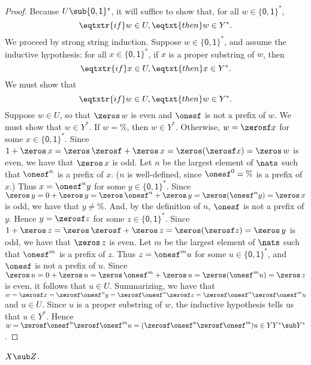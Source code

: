 \begin{proof}
Because $U\sub\{\mathsf{0,1}\}^*$, it will suffice to show that,
for all $w\in\{\mathsf{0,1}\}^*$,
\begin{displaymath}
  \eqtxtr{if} w\in U, \eqtxt{then} w\in Y^* .
\end{displaymath}
We proceed by strong string induction.  Suppose $w\in\{\mathsf{0,1}\}^*$,
and assume the inductive hypothesis: for all $x\in\{\mathsf{0,1}\}^*$,
if $x$ is a proper substring of $w$, then
\begin{displaymath}
  \eqtxtr{if} x\in U, \eqtxt{then} x\in Y^* .
\end{displaymath}
We must show that
\begin{displaymath}
  \eqtxtr{if} w\in U, \eqtxt{then} w\in Y^* .
\end{displaymath}
Suppose $w\in U$, so that $\zeros\,w$ is even and $\onesf$ is not a
prefix of $w$.  We must show that $w\in Y^*$.  If $w=\%$, then $w\in
Y^*$.  Otherwise, $w=\zerosf x$ for some $x\in\{\mathsf{0,1}\}^*$.
Since $1 + \zeros\,x = \zeros\,\zerosf + \zeros\,x = \zeros(\zerosf x)
= \zeros\,w$ is even, we have that $\zeros\,x$ is odd. Let $n$ be the
largest element of $\nats$ such that $\onesf^n$ is a prefix of
$x$. ($n$ is well-defined, since $\onesf^0=\%$ is a prefix of $x$.)
Thus $x = \onesf^ny$ for some $y\in\{\mathsf{0,1}\}^*$.  Since
$\zeros\, y = 0 + \zeros\,y = \zeros\,\onesf^n + \zeros\,y =
\zeros(\onesf^n y) = \zeros\,x$ is odd, we have that $y\neq\%$.  And,
by the definition of $n$, $\onesf$ is not a prefix of $y$.  Hence
$y=\zerosf z$ for some $z\in\{\mathsf{0,1}\}^*$.  Since $1 + \zeros\,z
= \zeros\,\zerosf + \zeros\,z = \zeros(\zerosf z) = \zeros\,y$ is odd,
we have that $\zeros\,z$ is even.  Let $m$ be the largest element of
$\nats$ such that $\onesf^m$ is a prefix of $z$.  Thus $z=\onesf^m u$
for some $u\in\{\mathsf{0,1}\}^*$, and $\onesf$ is not a prefix of
$u$.  Since $\zeros\,u = 0 + \zeros\,u = \zeros\,\onesf^m + \zeros\,u
= \zeros(\onesf^m u) = \zeros\,z$ is even, it follows that $u\in U$.
Summarizing, we have that $w = \zerosf x = \zerosf \onesf^n y =
\zerosf \onesf^n \zerosf z = \zerosf \onesf^n \zerosf \onesf^m u$ and
$u\in U$.  Since $u$ is a proper substring of $w$, the inductive
hypothesis tells us that $u\in Y^*$.  Hence $w = \zerosf \onesf^n
\zerosf \onesf^m u = (\zerosf \onesf^n \zerosf \onesf^m) u \in
YY^*\sub Y^*$.
\end{proof}

\begin{lemma}
\label{RegSyn1Lem5}
$X\sub Z$.
\end{lemma}

